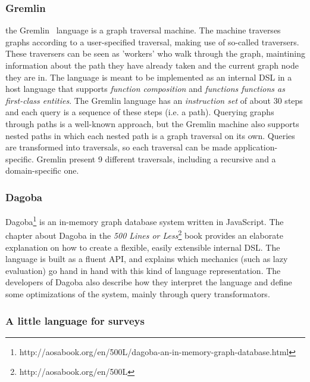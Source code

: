 \subsubsection*{Gremlin}
the Gremlin~\cite{Gremlin} language is a graph traversal machine. The machine traverses graphs according to a user-specified traversal, making use of so-called traversers. These traversers can be seen as 'workers' who walk through the graph, maintining information about the path they have already taken and the current graph node they are in. The language is meant to be implemented as an internal DSL in a host language that supports \textit{function composition} and \textit{functions functions as first-class entities}. The Gremlin language has an \textit{instruction set} of about 30 steps and each query is a sequence of these steps (i.e. a path). Querying graphs through paths is a well-known approach, but the Gremlin machine also supports nested paths in which each nested path is a graph traversal on its own. Queries are transformed into traversals, so each traversal can be made application-specific. Gremlin present 9 different traversals, including a recursive and a domain-specific one. 

\subsubsection*{Dagoba}

Dagoba\footnote{http://aosabook.org/en/500L/dagoba-an-in-memory-graph-database.html} is an in-memory graph database system written in JavaScript. The chapter about Dagoba in the \textit{500 Lines or Less}\footnote{http://aosabook.org/en/500L} book provides an elaborate explanation on how to create a flexible, easily extensible internal DSL. The language is built as a fluent API, and explains which mechanics (such as lazy evaluation) go hand in hand with this kind of language representation. The developers of Dagoba also describe how they interpret the language and define some optimizations of the system, mainly through query transformators.

\subsubsection*{A little language for surveys}

